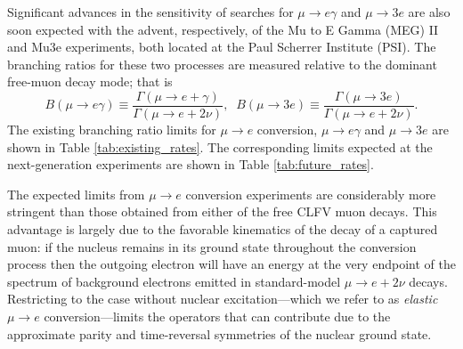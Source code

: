 \documentclass{book}[letterpaper,12pt]
\begin{document}
Significant advances in the sensitivity of searches for $\mu\rightarrow e\gamma$ and $\mu\rightarrow 3e$ are also soon expected with the advent, respectively, of the Mu to E Gamma (MEG) II and Mu3e experiments, both located at the Paul Scherrer Institute (PSI). The branching ratios for these two processes are measured relative to the dominant free-muon decay mode; that is
\begin{equation}
B(\mu\rightarrow e\gamma)\equiv\frac{\Gamma\left(\mu\rightarrow e+\gamma\right)}{\Gamma\left(\mu\rightarrow e+2\nu\right)},\;\;B(\mu\rightarrow 3e)\equiv\frac{\Gamma\left(\mu\rightarrow 3e\right)}{\Gamma\left(\mu\rightarrow e+2\nu\right)}.
\end{equation} 
The existing branching ratio limits for $\mu\rightarrow e$ conversion, $\mu\rightarrow e\gamma$ and $\mu\rightarrow 3e$ are shown in Table \ref{tab:existing_rates}. The corresponding limits expected at the next-generation experiments are shown in Table \ref{tab:future_rates}. 

The expected limits from $\mu\rightarrow e$ conversion experiments are considerably more stringent than those obtained from either of the free CLFV muon decays. This advantage is largely due to the favorable kinematics of the decay of a captured muon: if the nucleus remains in its ground state throughout the conversion process then the outgoing electron will have an energy at the very endpoint of the spectrum of background electrons emitted in standard-model $\mu\rightarrow e + 2\nu$ decays. Restricting to the case without nuclear excitation---which we refer to as \textit{elastic} $\mu\rightarrow e$ conversion---limits the operators that can contribute due to the approximate parity and time-reversal symmetries of the nuclear ground state.
\end{document}
